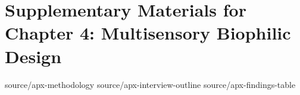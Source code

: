 \chapter{Supplementary Materials for Chapter 4: Multisensory Biophilic Design}
\label{app:multisensory}

{source/apx-methodology}
{source/apx-interview-outline}
{source/apx-findings-table}